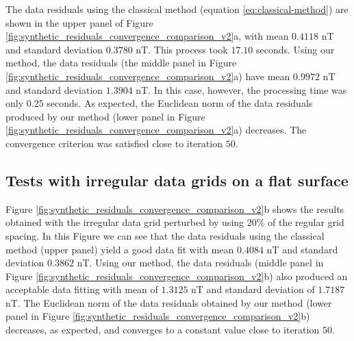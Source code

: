 \documentclass[manuscript]{geophysics}
\begin{document}
The data residuals using the classical method (equation \ref{eq:classical-method})  
are shown in the upper panel of Figure \ref{fig:synthetic_residuals_convergence_comparison_v2}a, 
with mean $0.4118$ nT and standard deviation $0.3780$ nT. This process took $17.10$ seconds.
Using our method, the data residuals (the middle panel in Figure
\ref{fig:synthetic_residuals_convergence_comparison_v2}a) have mean $0.9972$ nT and standard
deviation $1.3904$ nT. In this case, however, the processing time was only $0.25$ seconds.
As expected, the Euclidean norm of the data residuals produced by our method 
(lower panel in Figure \ref{fig:synthetic_residuals_convergence_comparison_v2}a) decreases. 
The convergence criterion was satisfied close to iteration $50$.

\subsection*{Tests with irregular data grids on a flat surface}

Figure \ref{fig:synthetic_residuals_convergence_comparison_v2}b shows the results obtained
with the irregular data grid perturbed by using $20\%$ of the regular grid spacing.
In this Figure we can see that the data residuals 
using the classical method (upper panel) yield a good data fit with mean $0.4084$ nT and standard
deviation $0.3862$ nT. 
Using our method, the data residuals (middle panel in Figure 
\ref{fig:synthetic_residuals_convergence_comparison_v2}b) also produced an acceptable data 
fitting with mean of  $1.3125$ nT and standard deviation of $1.7187$ nT. 
The Euclidean norm of the data residuals obtained by our method 
(lower panel in Figure \ref{fig:synthetic_residuals_convergence_comparison_v2}b) decreases, 
as expected, and converges to a constant value close to iteration $50$. 
\end{document}
